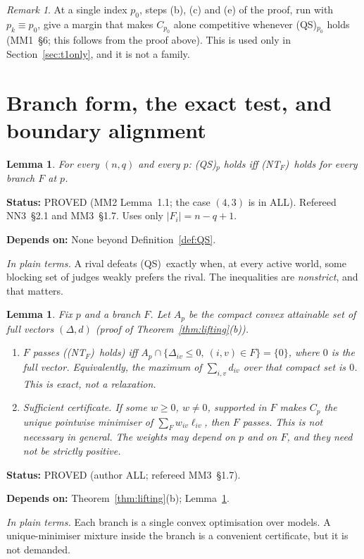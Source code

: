 \documentclass[11pt]{article}
\newtheorem{lemma}[theorem]{Lemma}
\theoremstyle{definition}
\theoremstyle{remark}
\newtheorem{remark}[theorem]{Remark}
\newcommand{\src}[1]{\textsf{#1}}
\newcommand{\status}[1]{\par\smallskip\noindent\textbf{Status:} #1\par}
\newcommand{\deps}[1]{\noindent\textbf{Depends on:} #1\par}
\newcommand{\inwords}[1]{\noindent\textit{In plain terms.} #1\par\smallskip}
\newcommand{\QS}{\textup{(QS)}}
\newcommand{\NT}{\textup{(NT$_F$)}}
\begin{document}
\begin{remark}\label{rem:single-index}
At a single index $p_0$, steps (b), (c) and (e) of the proof, run with $p_k\equiv p_0$, give a margin that makes $C_{p_0}$ alone competitive whenever \QS$_{p_0}$ holds (\src{MM1}~\S6; this follows from the proof above). This is used only in Section~\ref{sec:t1only}, and it is not a family.
\end{remark}

\section{Branch form, the exact test, and boundary alignment}\label{sec:branch}

\begin{lemma}\label{lem:branchform}
For every $(n,q)$ and every $p$: \QS$_p$ holds iff \NT\ holds for every branch $F$ at $p$.
\end{lemma}
\status{PROVED (\src{MM2} Lemma~1.1; the case $(4,3)$ is in \src{ALL}). Refereed \src{NN3}~\S2.1 and \src{MM3}~\S1.7. Uses only $|F_i|=n-q+1$.}
\deps{None beyond Definition~\ref{def:QS}.}
\inwords{A rival defeats \QS\ exactly when, at every active world, some blocking set of judges weakly prefers the rival. The inequalities are \emph{nonstrict}, and that matters.}

\begin{lemma}\label{lem:branchtest}
Fix $p$ and a branch $F$. Let $A_p$ be the compact convex attainable set of full vectors $(\Delta,d)$ (proof of Theorem~\ref{thm:lifting}(b)).
\begin{enumerate}[label=(\alph*)]
\item $F$ passes (\NT\ holds) iff $A_p\cap\{\Delta_{iv}\le0,\ (i,v)\in F\}=\{0\}$, where $0$ is the full vector. Equivalently, the maximum of $\sum_{i,v}d_{iv}$ over that compact set is $0$. This is exact, not a relaxation.
\item \emph{Sufficient certificate.} If some $w\ge0$, $w\ne0$, supported in $F$ makes $C_p$ the \emph{unique} pointwise minimiser of $\sum_Fw_{iv}\ell_{iv}$, then $F$ passes. This is not necessary in general. The weights may depend on $p$ and on $F$, and they need not be strictly positive.
\end{enumerate}
\end{lemma}
\status{PROVED (author \src{ALL}; refereed \src{MM3}~\S1.7).}
\deps{Theorem~\ref{thm:lifting}(b); Lemma~\ref{lem:branchform}.}
\inwords{Each branch is a single convex optimisation over models. A unique-minimiser mixture inside the branch is a convenient certificate, but it is not demanded.}
\end{document}
